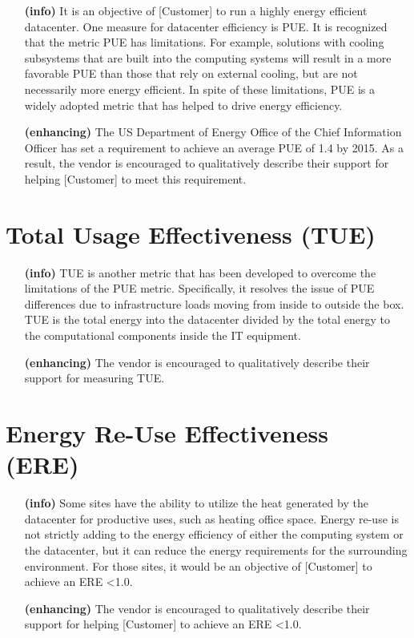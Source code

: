 \begin{itemize}

\item[\textbf{(info)}]
It is an objective of [Customer] to run a highly energy efficient datacenter.  
One measure for datacenter efficiency is PUE.  It is recognized that the metric PUE 
has limitations.  For example, solutions with cooling subsystems that are built 
into the computing systems will result in a more favorable PUE than those that rely 
on external cooling, but are not necessarily more energy efficient.  In spite of 
these limitations, PUE is a widely adopted metric that has helped to drive energy efficiency.

\item[\textbf{(enhancing)}]
The US Department of Energy Office of the Chief Information Officer has set a 
requirement to achieve an average PUE of 1.4 by 2015.  As a result, the vendor 
is encouraged to qualitatively describe their support for helping [Customer] to 
meet this requirement.

\end{itemize}

\section{Total Usage Effectiveness (TUE)}

\begin{itemize}

\item[\textbf{(info)}]
TUE is another metric that has been developed to overcome the limitations of the 
PUE metric.  Specifically, it resolves the issue of PUE differences due to infrastructure 
loads moving from inside to outside the box.  TUE is the total energy into the datacenter 
divided by the total energy to the computational components inside the IT equipment.

\item[\textbf{(enhancing)}]
The vendor is encouraged to qualitatively describe their support for measuring TUE.
\end{itemize}

\section{Energy Re-Use Effectiveness (ERE)}

\begin{itemize}

\item[\textbf{(info)}]
Some sites have the ability to utilize the heat generated by the datacenter for productive 
uses, such as heating office space.  Energy re-use is not strictly adding to the energy 
efficiency of either the computing system or the datacenter, but it can reduce the energy 
requirements for the surrounding environment.  For those sites, it would be an objective 
of [Customer] to achieve an ERE \textless 1.0.  

\item[\textbf{(enhancing)}]
The vendor is encouraged to qualitatively describe their support for helping [Customer] 
to achieve an ERE \textless 1.0.  

\end{itemize}

